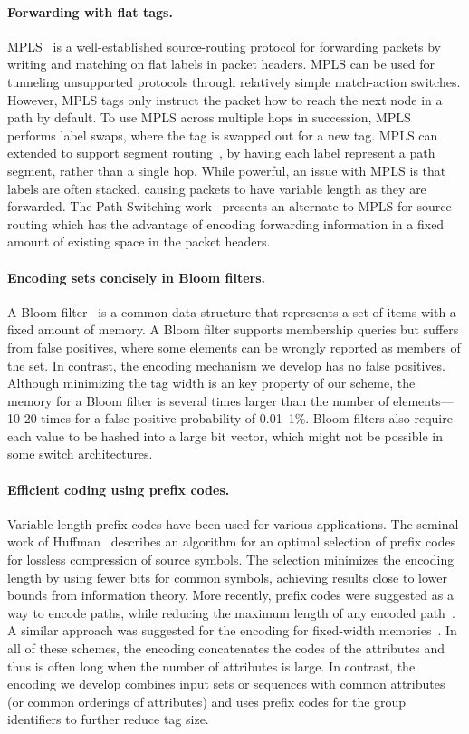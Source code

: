 \paragraph{Forwarding with flat tags.}
MPLS~\cite{mpls} is a well-established source-routing protocol for forwarding 
packets by writing and matching on flat labels in packet headers. MPLS can
 be used for tunneling unsupported protocols through relatively simple 
 match-action switches. However, MPLS tags only instruct the packet 
 how to reach the next node in a path by default. To use MPLS across 
 multiple hops in succession, MPLS performs label swaps, where the tag is
  swapped out for a new tag. MPLS can extended to support segment routing~\cite{segmentrouting}, 
  by having each label represent a path segment, rather than a single hop. 
While powerful, an issue with MPLS is that labels are often stacked, causing 
packets to have variable length as they are forwarded. The Path Switching work~\cite{pathswitching} presents an alternate to MPLS for source routing which
has the advantage of encoding forwarding information in a fixed amount 
of existing space in the packet headers. 

\paragraph{Encoding sets concisely in Bloom filters.} A Bloom
filter~\cite{Bloom} is a common data structure that represents a set of
items with a fixed amount of memory. A Bloom filter supports membership
queries but suffers from false positives, where some elements can be
wrongly reported as members of the set. In contrast, the encoding
mechanism we develop has no false positives.  Although minimizing the
tag width is an key property of our scheme, the memory for a Bloom
filter is several times larger than the number of elements---10-20 times
for a false-positive probability of 0.01--1\%. Bloom filters also
require each value to be hashed into a large bit vector, which might not
be possible in some switch architectures.

\paragraph{Efficient coding using prefix codes.} Variable-length prefix
codes have been used for various applications. The seminal work of
Huffman~\cite{Huffman} describes an algorithm for an optimal selection
of prefix codes for lossless compression of source symbols. The
selection minimizes the encoding length by using fewer bits for common
symbols, achieving results close to lower bounds from information
theory. More recently, prefix codes were suggested as a way to encode
paths, while reducing the maximum length of any encoded
path~\cite{PathEncoding}. A similar approach was suggested for the
encoding for fixed-width memories~\cite{FixedMemories}. In all of these
schemes, the encoding concatenates the codes of the attributes and thus
is often long when the number of attributes is large. In contrast, the
encoding we develop
combines input sets or sequences with common attributes (or
common orderings of attributes) and uses prefix codes for the
group identifiers to further reduce tag size.
